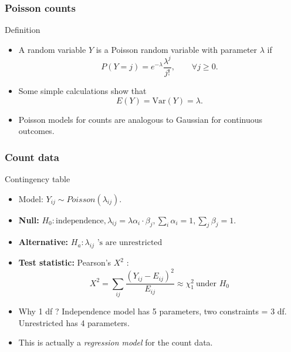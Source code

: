 \documentclass[handout]{beamer}
\begin{document}
   \begin{frame} \frametitle{Poisson counts}

   \begin{block}
   {Definition}
   \begin{itemize}
   \item A random variable $Y$ is a Poisson random variable
   with parameter $\lambda$ if
   $$
   P(Y=j) = e^{-\lambda} \frac{\lambda^j}{j!}, \qquad \forall j \geq 0.
   $$
   \item Some simple calculations show that
   $$
   E(Y)=\text{Var}(Y)=\lambda.
   $$
   \item Poisson models for counts are analogous to Gaussian for continuous
   outcomes.
   \end{itemize}
   \end{block}
   \end{frame}


   \begin{frame} \frametitle{Count data}

   \begin{block}
       {Contingency table}

       \begin{itemize}
       \item     Model: $Y_{ij} \sim  Poisson(\lambda_{ij} )$.


       \item {\bf Null:}
       $H_0 : \text{independence}, \lambda_{ij} = \lambda \alpha_i \cdot \beta_j , \sum_i \alpha_i = 1,  \sum_j \beta_j = 1.$

     \item {\bf
       Alternative:} $H_a : \text{$\lambda_{ij}$ 's are unrestricted}$

   \item {\bf    Test statistic:} Pearson's $X^2$ :
   $$
   X^2 = \sum_{ij} \frac{(Y_{ij}-E_{ij})^2}{E_{ij}} \approx \chi^2_1 \  \text{under $H_0$}$$

   \item
       Why 1 df ? Independence model has 5 parameters, two
       constraints = 3 df. Unrestricted has 4 parameters.

     \item This is actually a {\em regression model} for the count data.

       \end{itemize}

   \end{block}
   \end{frame}
\end{document}
